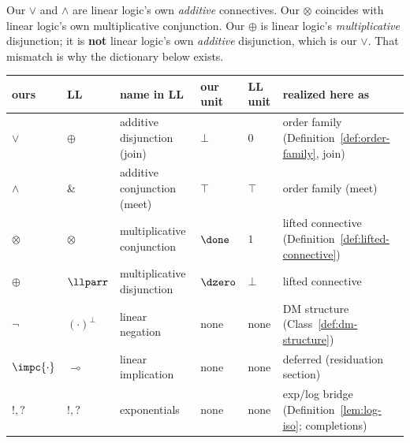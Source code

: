 Our $\vee$ and $\wedge$ are linear logic's own \emph{additive}
connectives. Our $\otimes$ coincides with linear logic's own
multiplicative conjunction. Our $\oplus$ is linear logic's
\emph{multiplicative} disjunction; it is \textbf{not} linear logic's
own \emph{additive} disjunction, which is our $\vee$. That mismatch is
why the dictionary below exists.

\begin{center}
{\footnotesize\setlength{\tabcolsep}{3pt}
\begin{tabular}{llllll}
\hline
\textbf{ours} & \textbf{LL} & \textbf{name in LL} & \textbf{our unit} & \textbf{LL unit} & \textbf{realized here as} \\
\hline
$\vee$ & $\oplus$ & additive disjunction (join) & $\bot$ & $0$ & order family (Definition~\ref{def:order-family}, join) \\
$\wedge$ & \& & additive conjunction (meet) & $\top$ & $\top$ & order family (meet) \\
$\otimes$ & $\otimes$ & multiplicative conjunction & $\done$ & $1$ & lifted connective (Definition~\ref{def:lifted-connective}) \\
$\oplus$ & $\llparr$ & multiplicative disjunction & $\dzero$ & $\bot$ & lifted connective \\
$\neg$ & $(\cdot)^\bot$ & linear negation & none & none & DM structure (Class~\ref{def:dm-structure}) \\
$\impc{\cdot}$ & $\multimap$ & linear implication & none & none & deferred (residuation section) \\
$!,?$ & $!,?$ & exponentials & none & none & exp/log bridge (Definition~\ref{lem:log-iso}; completions) \\
\hline
\end{tabular}
}
\end{center}


